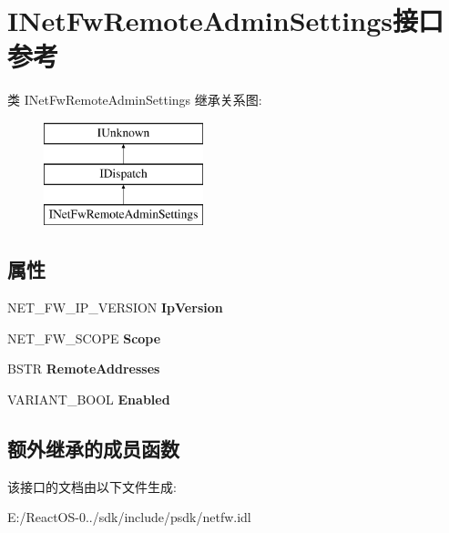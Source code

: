 \hypertarget{interface_i_net_fw_remote_admin_settings}{}\section{I\+Net\+Fw\+Remote\+Admin\+Settings接口 参考}
\label{interface_i_net_fw_remote_admin_settings}
类 I\+Net\+Fw\+Remote\+Admin\+Settings 继承关系图\+:\begin{figure}[H]
\begin{center}
\leavevmode
\includegraphics[height=3.000000cm]{interface_i_net_fw_remote_admin_settings}
\end{center}
\end{figure}
\subsection*{属性}
\begin{DoxyCompactItemize}
\item 
\mbox{\label{interface_i_net_fw_remote_admin_settings_ad1c5af70c826dbb9e2503e5cb784ed27}} 
N\+E\+T\+\_\+\+F\+W\+\_\+\+I\+P\+\_\+\+V\+E\+R\+S\+I\+ON {\bfseries Ip\+Version}
\item 
\mbox{\label{interface_i_net_fw_remote_admin_settings_a62256c5f0cfa25cda4290acd664cc329}} 
N\+E\+T\+\_\+\+F\+W\+\_\+\+S\+C\+O\+PE {\bfseries Scope}
\item 
\mbox{\label{interface_i_net_fw_remote_admin_settings_abc72fdd4f185cfee21012d6c36f33e8d}} 
B\+S\+TR {\bfseries Remote\+Addresses}
\item 
\mbox{\label{interface_i_net_fw_remote_admin_settings_ab7029483717c5f7e0f2549769528815d}} 
V\+A\+R\+I\+A\+N\+T\+\_\+\+B\+O\+OL {\bfseries Enabled}
\end{DoxyCompactItemize}
\subsection*{额外继承的成员函数}


该接口的文档由以下文件生成\+:\begin{DoxyCompactItemize}
\item 
E\+:/\+React\+O\+S-\/0../sdk/include/psdk/netfw.\+idl\end{DoxyCompactItemize}
